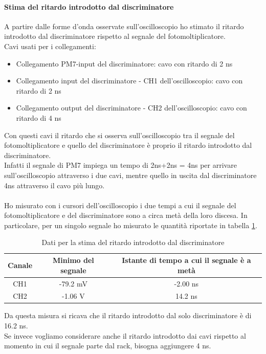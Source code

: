 \documentclass{article}
\begin{document}
\paragraph{Stima del ritardo introdotto dal discriminatore} A partire dalle forme d'onda osservate sull'oscilloscopio ho stimato il ritardo introdotto dal discriminatore rispetto al segnale del fotomoltiplicatore.\\
Cavi usati per i collegamenti:
\begin{itemize}
    \item Collegamento PM7-input del discriminatore: cavo con ritardo di 2 ns
    \item Collegamento input del discriminatore - CH1 dell'oscilloscopio: cavo con ritardo di 2 ns
     \item Collegamento output del discriminatore - CH2 dell'oscilloscopio: cavo con ritardo di 4 ns
\end{itemize}
Con questi cavi il ritardo che si osserva sull'oscilloscopio tra il segnale del fotomoltiplicatore e quello del discriminatore è proprio il ritardo introdotto dal discriminatore. 
\\
Infatti il segnale di PM7 impiega un tempo di 2ns+2ns = 4ns per arrivare sull'oscilloscopio attraverso i due cavi, mentre quello in uscita dal discriminatore 4ns attraverso il cavo più lungo.
\\
\\
Ho misurato con i cursori dell'oscilloscopio i due tempi a cui il segnale del fotomoltiplicatore e del discriminatore sono a circa metà della loro discesa. In particolare, per un singolo segnale ho misurato le quantità riportate in tabella \ref{tab1}.

\newpage
\begin{table}[h!]
    \centering
    \begin{tabular}{|c|c|c|}
        \hline
        Canale & Minimo del segnale & Istante di tempo a cui il segnale è a metà\\
        \hline
            CH1 & -79.2 mV & -2.00 ns \\
            CH2 & -1.06 V & 14.2 ns   \\
        \hline
    \end{tabular}
    \caption{Dati per la stima del ritardo introdotto dal discriminatore} \label{tab1}
\end{table}
Da questa misura si ricava che il ritardo introdotto dal solo discriminatore è di 16.2 ns. \\Se invece vogliamo considerare anche il ritardo introdotto dai cavi rispetto al momento in cui il segnale parte dal rack, bisogna aggiungere 4 ns.
\end{document}
